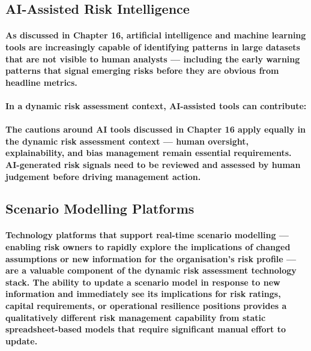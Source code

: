 \subsection{AI-Assisted Risk Intelligence}
\paragraph{As discussed in Chapter 16, artificial intelligence and machine learning tools are increasingly capable of identifying patterns in large datasets that are not visible to human analysts — including the early warning patterns that signal emerging risks before they are obvious from headline metrics.}
\paragraph{In a dynamic risk assessment context, AI-assisted tools can contribute:}
\begin{itemize}
\end{itemize}
\paragraph{The cautions around AI tools discussed in Chapter 16 apply equally in the dynamic risk assessment context — human oversight, explainability, and bias management remain essential requirements. AI-generated risk signals need to be reviewed and assessed by human judgement before driving management action.}

\subsection{Scenario Modelling Platforms}
\paragraph{Technology platforms that support real-time scenario modelling — enabling risk owners to rapidly explore the implications of changed assumptions or new information for the organisation's risk profile — are a valuable component of the dynamic risk assessment technology stack. The ability to update a scenario model in response to new information and immediately see its implications for risk ratings, capital requirements, or operational resilience positions provides a qualitatively different risk management capability from static spreadsheet-based models that require significant manual effort to update.}

